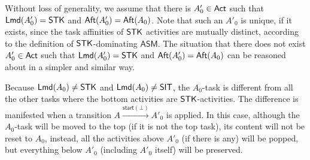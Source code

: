 \documentclass[preprint,12pt]{elsarticle}
\newcommand\act{{\sf Act}}
\newcommand\aft{{\sf Aft}}
\newcommand\lmd{{\sf Lmd}}
\newcommand\singletask{{\sf STK}}
\newcommand{\AMASS}{\textsf{ASM}}
\newcommand\startactivity{{\mathsf{start} }}
\newcommand{\STK}{\mathsf{STK}}
\newcommand{\SIT}{\mathsf{SIT}}
\begin{document}
Without loss of generality, we assume that there is $A'_0 \in \act$ such that $\lmd(A_0')=\STK$ and $\aft(A_0') = \aft(A_0)$. Note that such an $A'_0$ is unique, if it exists, since the task affinities of $\singletask$ activities are mutually distinct, according to the definition of $\singletask$-dominating $\AMASS$. The situation that there does not exist $A'_0 \in \act$ such that $\lmd(A_0')=\STK$ and $\aft(A_0') = \aft(A_0)$ can be reasoned about in a simpler and similar way. 


Because $\lmd(A_0) \neq \STK$ and $\lmd(A_0) \neq \SIT$, the $A_0$-task is different from all the other tasks where the bottom activities are $\singletask$-activities. The difference is manifested  when a transition $A \xrightarrow{\startactivity(\bot)} A'_0$ is applied. In this case, although the $A_0$-task will be moved to the top (if it is not the top task), its content will not be reset to $A_0$, instead, all the activities above $A'_0$ (if there is any) will be popped, but everything below $A'_0$ (including $A'_0$ itself) will be preserved.  

\end{document}
